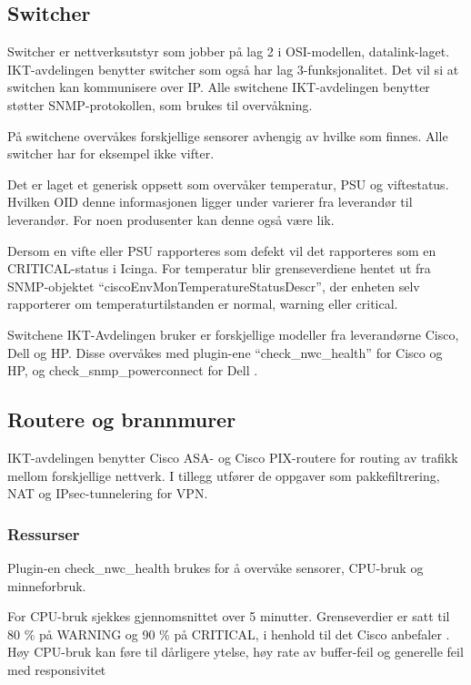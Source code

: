 \subsection{Switcher}\label{sec:switch}
Switcher er nettverksutstyr som jobber på lag 2 i OSI-modellen, datalink-laget. IKT-avdelingen benytter switcher som også har lag 3-funksjonalitet. Det vil si at switchen kan kommunisere over IP. Alle switchene IKT-avdelingen benytter støtter SNMP-protokollen, som brukes til overvåkning.

På switchene overvåkes forskjellige sensorer avhengig av hvilke som finnes. Alle switcher har for eksempel ikke vifter. 

Det er laget et generisk oppsett som overvåker temperatur, PSU og viftestatus. Hvilken OID denne informasjonen ligger under varierer fra leverandør til leverandør. For noen produsenter kan denne også være lik. 

Dersom en vifte eller PSU rapporteres som defekt vil det rapporteres som en CRITICAL-status i Icinga. For temperatur blir grenseverdiene hentet ut fra SNMP-objektet ``ciscoEnvMonTemperatureStatusDescr'', der enheten selv rapporterer om temperaturtilstanden er normal, warning eller critical\cite{cisco_env_mib}.

Switchene IKT-Avdelingen bruker er forskjellige modeller fra leverandørne Cisco, Dell og HP. Disse overvåkes med plugin-ene ``check\_nwc\_health'' \cite{checknwc} for Cisco og HP, og check\_snmp\_powerconnect for Dell \cite{checkpowerconnect}.

\subsection{Routere og brannmurer}
IKT-avdelingen benytter Cisco ASA- og Cisco PIX-routere for routing av trafikk mellom forskjellige nettverk. I tillegg utfører de oppgaver som pakkefiltrering, NAT og IPsec-tunnelering for VPN.

\subsubsection{Ressurser}
Plugin-en check\_nwc\_health brukes for å overvåke sensorer, CPU-bruk og minneforbruk.

For CPU-bruk sjekkes gjennomsnittet over 5 minutter. Grenseverdier er satt til 80 \% på WARNING og 90 \% på CRITICAL, i henhold til det Cisco anbefaler \cite{ciscounifiedcommunication}. Høy CPU-bruk kan føre til dårligere ytelse, høy rate av buffer-feil og generelle feil med responsivitet \cite{ciscocpurouters}

